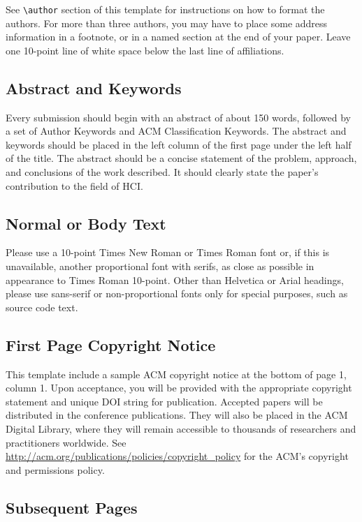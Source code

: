 \documentclass{sigchi}
\begin{document}
See \texttt{{\textbackslash}author} section of this template for
instructions on how to format the authors. For more than three
authors, you may have to place some address information in a footnote,
or in a named section at the end of your paper. Leave one 10-point
line of white space below the last line of affiliations.

\subsection{Abstract and Keywords}

Every submission should begin with an abstract of about 150 words,
followed by a set of Author Keywords and ACM Classification
Keywords. The abstract and keywords should be placed in the left
column of the first page under the left half of the title. The
abstract should be a concise statement of the problem, approach, and
conclusions of the work described. It should clearly state the paper's
contribution to the field of HCI\@.

\subsection{Normal or Body Text}

Please use a 10-point Times New Roman or Times Roman font or, if this
is unavailable, another proportional font with serifs, as close as
possible in appearance to Times Roman 10-point. Other than Helvetica
or Arial headings, please use sans-serif or non-proportional fonts
only for special purposes, such as source code text.

\subsection{First Page Copyright Notice}
This template include a sample ACM copyright notice at the bottom of
page 1, column 1.  Upon acceptance, you will be provided with the
appropriate copyright statement and unique DOI string for publication.
Accepted papers will be distributed in the conference
publications. They will also be placed in the ACM Digital Library,
where they will remain accessible to thousands of researchers and
practitioners worldwide. See
\url{http://acm.org/publications/policies/copyright_policy} for the
ACM’s copyright and permissions policy.


\subsection{Subsequent Pages}
\end{document}
